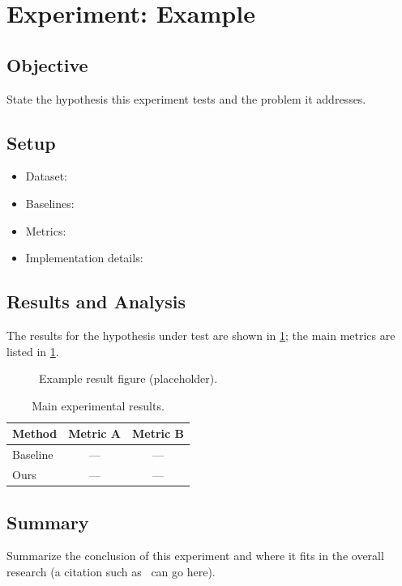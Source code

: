 
\section{Experiment: Example}

\subsection{Objective}
State the hypothesis this experiment tests and the problem it addresses.

\subsection{Setup}
\begin{itemize}
  \item Dataset:
  \item Baselines:
  \item Metrics:
  \item Implementation details:
\end{itemize}

\subsection{Results and Analysis}
The results for the hypothesis under test are shown in \cref{fig:ex-result};
the main metrics are listed in \cref{tab:ex-main}.

\begin{figure}[H]
  \centering
  \fbox{\rule{0pt}{4cm}\rule{0.7\linewidth}{0pt}}
  \caption{Example result figure (placeholder).}%
  \label{fig:ex-result}
\end{figure}

\begin{table}[H]
  \centering
  \caption{Main experimental results.}%
  \label{tab:ex-main}
  \begin{tabular}{lcc}
    \toprule
    Method   & Metric A & Metric B \\
    \midrule
    Baseline & --- & --- \\
    Ours     & --- & --- \\
    \bottomrule
  \end{tabular}
\end{table}

\subsection{Summary}
Summarize the conclusion of this experiment and where it fits in the overall
research (a citation such as~\cite{egodemo2026} can go here).
